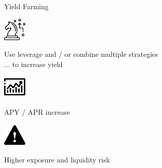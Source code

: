 \documentclass[handout]{beamer}
\begin{document}
\begin{frame}{Yield Farming}


\begin{minipage}{0.2\textwidth}
			\begin{center}
				\includegraphics[height=3em]{../assets/images/strategy.png}
				
			\end{center}
		\end{minipage}
		\hspace{1 em}
		\begin{minipage}{0.72\textwidth}
			Use leverage and / or combine multiple strategies \\ ... to increase yield

		\end{minipage}
		\pause
		\vspace{2 em}
		
		

		\begin{minipage}{0.2\textwidth}
			\begin{center}
				\includegraphics[height=3em]{../assets/images/exchange.png}
			\end{center}
		\end{minipage}
		\hspace{1 em}
		\begin{minipage}{0.72\textwidth}
			APY / APR increase
		\end{minipage}
	
		\pause
		\vspace{2 em}
		\begin{minipage}{0.2\textwidth}
			\begin{center}
				\includegraphics[height=3em]{../assets/images/warning.png}
			\end{center}
		\end{minipage}
		\hspace{1 em}
		\begin{minipage}{0.72\textwidth}
		Higher exposure and liquidity risk 
		\end{minipage}
		
		
		
		
\end{frame}
\end{document}
